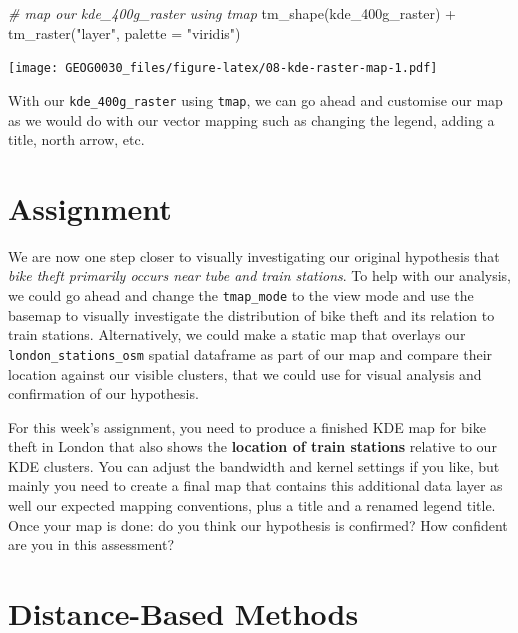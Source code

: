 \documentclass[
]{book}
\newenvironment{Shaded}{\begin{snugshade}}{\end{snugshade}}
\newcommand{\AttributeTok}[1]{\textcolor[rgb]{0.77,0.63,0.00}{#1}}
\newcommand{\CommentTok}[1]{\textcolor[rgb]{0.56,0.35,0.01}{\textit{#1}}}
\newcommand{\FunctionTok}[1]{\textcolor[rgb]{0.00,0.00,0.00}{#1}}
\newcommand{\NormalTok}[1]{#1}
\newcommand{\SpecialCharTok}[1]{\textcolor[rgb]{0.00,0.00,0.00}{#1}}
\newcommand{\StringTok}[1]{\textcolor[rgb]{0.31,0.60,0.02}{#1}}
\begin{document}
\begin{Shaded}
\begin{Highlighting}[]
\CommentTok{\# map our kde\_400g\_raster using tmap}
\FunctionTok{tm\_shape}\NormalTok{(kde\_400g\_raster) }\SpecialCharTok{+}
  \FunctionTok{tm\_raster}\NormalTok{(}\StringTok{"layer"}\NormalTok{, }\AttributeTok{palette =} \StringTok{"viridis"}\NormalTok{)}
\end{Highlighting}
\end{Shaded}

\texttt{[image: GEOG0030\_files/figure-latex/08-kde-raster-map-1.pdf]}

With our \texttt{kde\_400g\_raster} using \texttt{tmap}, we can go ahead and customise our map as we would do with our vector mapping such as changing the legend, adding a title, north arrow, etc.

\hypertarget{assignment-w08}{%
\section{Assignment}\label{assignment-w08}}

We are now one step closer to visually investigating our original hypothesis that \emph{bike theft primarily occurs near tube and train stations}. To help with our analysis, we could go ahead and change the \texttt{tmap\_mode} to the view mode and use the basemap to visually investigate the distribution of bike theft and its relation to train stations. Alternatively, we could make a static map that overlays our \texttt{london\_stations\_osm} spatial dataframe as part of our map and compare their location against our visible clusters, that we could use for visual analysis and confirmation of our hypothesis.

For this week's assignment, you need to produce a finished KDE map for bike theft in London that also shows the \textbf{location of train stations} relative to our KDE clusters. You can adjust the bandwidth and kernel settings if you like, but mainly you need to create a final map that contains this additional data layer as well our expected mapping conventions, plus a title and a renamed legend title. Once your map is done: do you think our hypothesis is confirmed? How confident are you in this assessment?

\hypertarget{distance-based-methods}{%
\section{Distance-Based Methods}\label{distance-based-methods}}
\end{document}
